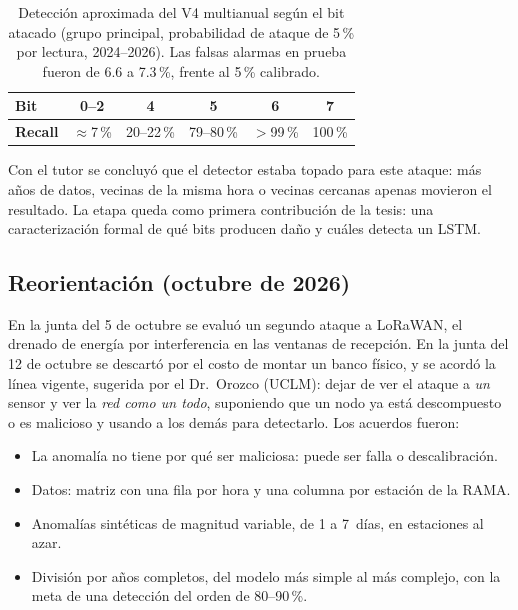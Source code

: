 \documentclass[11pt, letterpaper]{article}
\begin{document}
\begin{table}[H]
  \centering
  \small
  \caption{Detección aproximada del V4 multianual según el bit atacado (grupo principal,
    probabilidad de ataque de 5\,\% por lectura, 2024--2026). Las falsas alarmas en prueba
    fueron de 6.6 a 7.3\,\%, frente al 5\,\% calibrado.}
  \label{tab:bits}
  \begin{tabular}{@{}lccccc@{}}
    \toprule
    \textbf{Bit} & 0--2 & 4 & 5 & 6 & 7 \\
    \midrule
    \textbf{Recall} & $\approx$7\,\% & 20--22\,\% & 79--80\,\% & $>$99\,\% & 100\,\% \\
    \bottomrule
  \end{tabular}
\end{table}

Con el tutor se concluyó que el detector estaba topado para este ataque: más años de
datos, vecinas de la misma hora o vecinas cercanas apenas movieron el resultado. La etapa
queda como primera contribución de la tesis: una caracterización formal de qué bits
producen daño y cuáles detecta un LSTM.

\subsection{Reorientación (octubre de 2026)}

En la junta del 5 de octubre se evaluó un segundo ataque a LoRaWAN, el drenado de energía
por interferencia en las ventanas de recepción. En la junta del 12 de octubre se descartó
por el costo de montar un banco físico, y se acordó la línea vigente, sugerida por el
Dr.~Orozco (UCLM): dejar de ver el ataque a \emph{un} sensor y ver la \emph{red como un
todo}, suponiendo que un nodo ya está descompuesto o es malicioso y usando a los demás
para detectarlo. Los acuerdos fueron:

\begin{itemize}
  \item La anomalía no tiene por qué ser maliciosa: puede ser falla o descalibración.
  \item Datos: matriz con una fila por hora y una columna por estación de la RAMA.
  \item Anomalías sintéticas de magnitud variable, de 1 a 7~días, en estaciones al azar.
  \item División por años completos, del modelo más simple al más complejo, con la meta
    de una detección del orden de 80--90\,\%.
\end{itemize}
\end{document}
